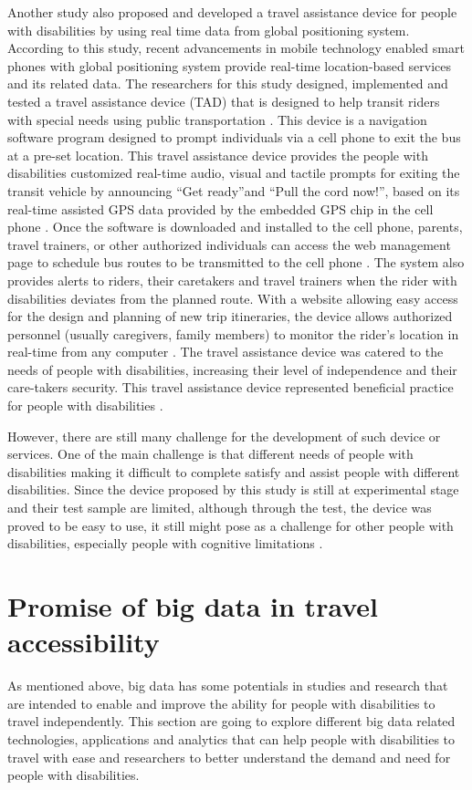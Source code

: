 Another study also proposed and developed a travel assistance device for people with 
disabilities by using real time data from global positioning system. According to 
this study, recent advancements in mobile technology enabled smart phones with global 
positioning system provide real-time location-based services and its related data.
The researchers for this study designed, implemented and tested a travel assistance device (TAD) 
that is designed to help transit riders with special needs using public transportation
\cite{Barbeau}. This device is a navigation software program designed to prompt 
individuals via a cell phone to exit the bus at a pre-set location. 
This travel assistance device provides the people with disabilities 
customized real-time audio, visual and tactile prompts for exiting the transit vehicle 
by announcing ``Get ready''and ``Pull the cord now!'', based on  its real-time assisted 
GPS data provided by the embedded GPS chip in the cell phone \cite{Barbeau}.  
Once the software is downloaded and installed to the cell phone,
parents, travel trainers, or other authorized individuals can access the web management
page to schedule bus routes to be transmitted to the cell phone \cite{Barbeau}.  The system also 
provides alerts to riders, their caretakers and travel trainers when the rider with 
disabilities deviates from the planned route. With a website allowing easy access 
for the design and planning of new trip itineraries, the device allows authorized 
personnel (usually caregivers, family members) to monitor the rider’s location 
in real-time from any computer \cite{Barbeau}. The travel assistance device was 
catered to the needs of people with disabilities, increasing their level of 
independence and their care-takers security. This travel assistance device 
represented beneficial practice for people with disabilities \cite{Barbeau}.

However, there are still many challenge for the development of such device or services. 
One of the main challenge is that different needs of people with disabilities
making it difficult to complete satisfy and assist people with different disabilities. 
Since the device proposed by this study is still at experimental stage and their 
test sample are limited, although through the test, the device was proved to be 
easy to use, it still might pose as a challenge for other people with disabilities, 
especially people with cognitive limitations \cite{Barbeau}. 


\section{Promise of big data in travel accessibility}
As mentioned above, big data has some potentials in studies and research that are intended 
to enable and improve the ability for people with disabilities to travel independently. 
This section are going to explore different big data related technologies, applications and 
analytics that can help people with disabilities to travel with ease and researchers to 
better understand the demand and need for people with disabilities.
